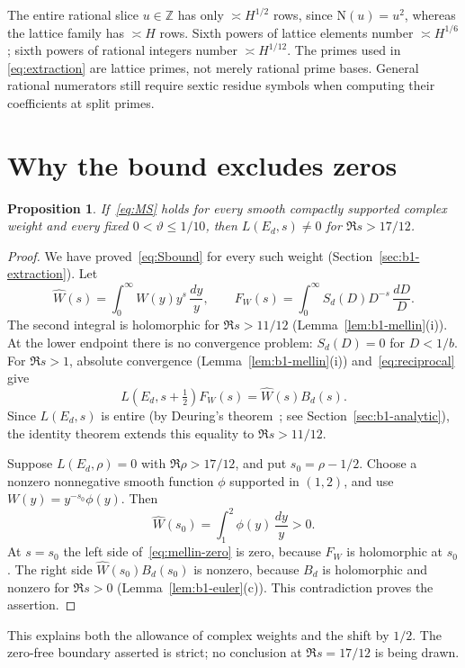 \documentclass[11pt]{article}
\numberwithin{equation}{section}
\newcommand{\N}{\mathrm N}
\newtheorem{proposition}{Proposition}
\begin{document}
The entire rational slice $u\in\mathbb Z$ has only $\asymp H^{1/2}$ rows,
since $\N(u)=u^2$, whereas the lattice family has $\asymp H$ rows.
Sixth powers of lattice elements number $\asymp H^{1/6}$; sixth powers
of rational integers number $\asymp H^{1/12}$. The primes used in
\eqref{eq:extraction} are lattice primes, not merely rational prime bases.
General rational numerators still require sextic residue symbols when
computing their coefficients at split primes.

\section{Why the bound excludes zeros}\label{sec:zeros}

\begin{proposition}
If~\eqref{eq:MS} holds for every smooth compactly supported complex
weight and every fixed $0<\vartheta\le1/10$, then
$L(E_d,s)\ne0$ for $\Re s>17/12$.
\end{proposition}
\begin{proof}
We have proved~\eqref{eq:Sbound} for every such weight (Section~\ref{sec:b1-extraction}). Let
\begin{equation}\label{eq:d028}
 \widehat W(s)=\int_0^\infty W(y)y^s\,\frac{dy}{y},\qquad
 F_W(s)=\int_0^\infty S_d(D)D^{-s}\,\frac{dD}{D}.
\end{equation}
The second integral is holomorphic for $\Re s>11/12$ (Lemma~\ref{lem:b1-mellin}(i)). At the lower
endpoint there is no convergence problem: $S_d(D)=0$ for $D<1/b$.
For $\Re s>1$, absolute convergence (Lemma~\ref{lem:b1-mellin}(i)) and~\eqref{eq:reciprocal} give
\begin{equation}\label{eq:mellin-zero}
 L(E_d,s+\tfrac12)F_W(s)=\widehat W(s)B_d(s).
\end{equation}
Since $L(E_d,s)$ is entire (by Deuring's theorem~\cite{Deuring}; see Section~\ref{sec:b1-analytic}), the identity
theorem extends this equality to $\Re s>11/12$.

Suppose $L(E_d,\rho)=0$ with $\Re\rho>17/12$, and put
$s_0=\rho-1/2$. Choose a nonzero nonnegative smooth function $\phi$
supported in $(1,2)$, and use $W(y)=y^{-s_0}\phi(y)$. Then
\begin{equation}\label{eq:d029}
 \widehat W(s_0)=\int_1^2\phi(y)\,\frac{dy}{y}>0.
\end{equation}
At $s=s_0$ the left side of~\eqref{eq:mellin-zero} is zero, because $F_W$ is
holomorphic at $s_0$. The right side $\widehat W(s_0)B_d(s_0)$ is nonzero, because
$B_d$ is holomorphic and nonzero for $\Re s>0$ (Lemma~\ref{lem:b1-euler}(c)). This
contradiction proves the assertion.
\end{proof}
This explains both the allowance of complex weights and the shift by
$1/2$. The zero-free boundary asserted is strict; no conclusion at
$\Re s=17/12$ is being drawn.
\end{document}

